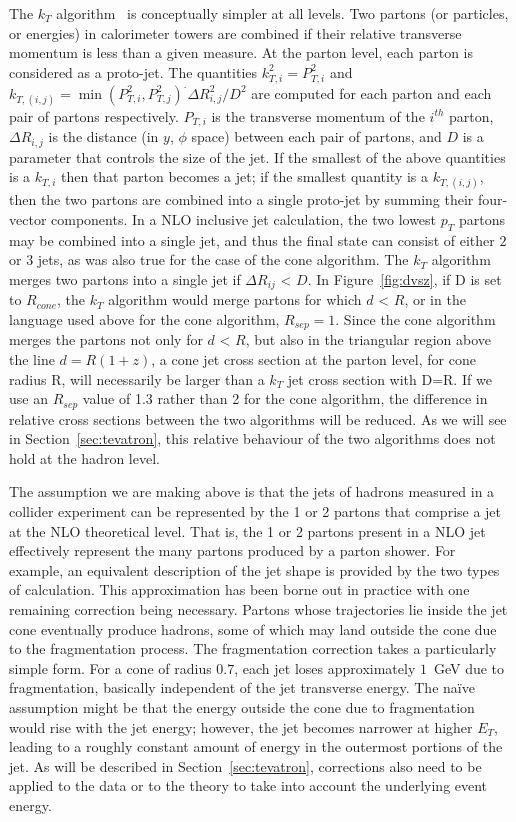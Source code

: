\documentclass[12pt]{iopart}
\begin{document}
The $k_T$ algorithm~\cite{Blazey:2000qt}  is conceptually simpler at all levels.  Two partons
(or particles, or energies) in
calorimeter towers are combined  if their relative transverse momentum is less than a given
measure. At the  parton level, each parton is considered as a proto-jet. The quantities 
$k^2_{T,i}=P^2_{T,i}$ and $k_{T,(i,j)}=\min(P^2_{T,i},P^2_{T,j})^.\Delta R^2_{i,j}/D^2$  are
computed for each parton and each pair of partons respectively. $P_{T,i}$ is the  transverse
momentum of the $i^{th}$ parton, $\Delta R_{i,j}$ is the distance (in $y$, $\phi$ space)  between
each pair of partons, and $D$ is a parameter that controls the size of the jet.  If the smallest
of the above quantities is a $k_{T,i}$ then that parton becomes a jet;  if the smallest quantity
is a $k_{T,(i,j)}$, then the two partons are combined into a single  proto-jet by summing their
four-vector components. In a NLO inclusive jet  calculation, the  two lowest $p_T$ partons may be
combined into a single jet, and thus the final state can consist of either $2$ or $3$ jets, as
was also true for the case of the cone algorithm. The $k_T$ algorithm merges two partons into a single jet
if $\Delta R_{ij}$ < $D$. In Figure~\ref{fig:dvsz}, if D is set to $R_{cone}$, the $k_T$ algorithm would
merge partons for which $d$ < $R$, or in the language used above for the cone algorithm, $R_{sep}=1$.
Since the cone algorithm merges the partons not only for $d$ < $R$, but also in the triangular region
above the line $d=R(1+z)$, a cone jet cross section at the parton level, for cone radius R, will necessarily
be larger than a $k_T$ jet cross section with D=R. If we use an $R_{sep}$ value of 1.3 rather than 2 for the
cone algorithm, the difference in relative cross sections between the two algorithms will be reduced. As we
will see in Section~\ref{sec:tevatron}, this relative behaviour of the two algorithms does not hold at the
hadron level. 

The assumption we are making above is that the jets of hadrons measured in a collider experiment can
be represented by the 1 or 2 partons that comprise a jet at the NLO theoretical level. That is, the 1
or 2 partons present in a NLO jet effectively represent the many partons produced by a parton shower.
For example, an equivalent description of the jet shape is provided by the two types of calculation. 
This approximation has been borne out in practice with one remaining correction being necessary.
Partons whose trajectories lie inside the jet cone eventually produce hadrons, some of which may land
outside the cone due to the fragmentation process. The fragmentation correction takes a particularly
simple form. For a cone of radius $0.7$, each jet loses approximately $1$~GeV due to fragmentation,
basically independent of the jet transverse energy. The na\"ive assumption might be that the energy
outside the cone due to fragmentation would rise with the jet energy; however, the jet becomes
narrower at higher $E_T$, leading to a roughly constant amount of energy in the outermost portions of
the jet. As will be described in Section~\ref{sec:tevatron}, corrections  also need to be applied to the data or to
the theory to take into account the underlying event energy. 
\end{document}
